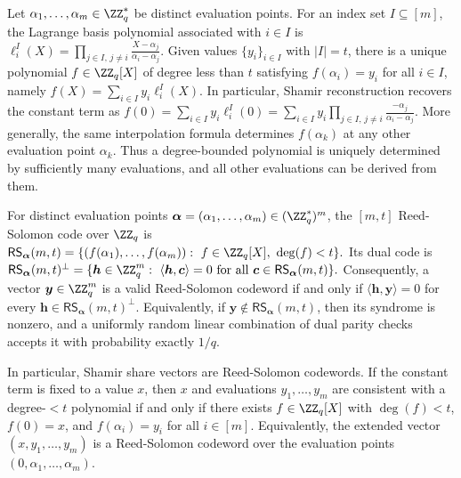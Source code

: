 \documentclass[runningheads]{llncs}
\begin{document}
\begin{definition}\label{def:lagrange_interpolation}
Let \(\alpha_1,\ldots,\alpha_m\in\ZZ_q^*\) be distinct evaluation points. For an index set \(I\subseteq[m]\), the Lagrange basis polynomial associated with \(i\in I\) is
$\ell_i^I(X)=\prod_{j\in I,\,j\neq i}\frac{X-\alpha_j}{\alpha_i-\alpha_j}.$
Given values \(\{y_i\}_{i\in I}\) with \(|I|=t\), there is a unique polynomial \(f\in\ZZ_q[X]\) of degree less than \(t\) satisfying \(f(\alpha_i)=y_i\) for all \(i\in I\), namely
$f(X)=\sum_{i\in I} y_i\ell_i^I(X).$
In particular, Shamir reconstruction recovers the constant term as
$f(0)=\sum_{i\in I} y_i\ell_i^I(0)
    =\sum_{i\in I} y_i\prod_{j\in I,\,j\neq i}\frac{-\alpha_j}{\alpha_i-\alpha_j}.$
More generally, the same interpolation formula determines \(f(\alpha_k)\) at any other evaluation point \(\alpha_k\). Thus a degree-bounded polynomial is uniquely determined by sufficiently many evaluations, and all other evaluations can be derived from them.
\end{definition}

\begin{definition}\label{def:rs_dual_code}
For distinct evaluation points \(\boldsymbol{\alpha}=(\alpha_1,\ldots,\alpha_m)\in(\ZZ_q^*)^m\), the \([m,t]\) Reed-Solomon code over \(\ZZ_q\) is
$\mathsf{RS}_{\boldsymbol{\alpha}}(m,t)=\{(f(\alpha_1),\ldots,f(\alpha_m)):\ f\in\ZZ_q[X],\ \deg(f)<t\}.$
Its dual code is
$\mathsf{RS}_{\boldsymbol{\alpha}}(m,t)^\perp=\{\boldsymbol{h}\in\ZZ_q^m:\ \langle \boldsymbol{h},\boldsymbol{c}\rangle=0
    \text{ for all } \boldsymbol{c}\in\mathsf{RS}_{\boldsymbol{\alpha}}(m,t)\}.$
Consequently, a vector \(\boldsymbol{y}\in\ZZ_q^m\) is a valid Reed-Solomon codeword if and only if
\(\langle \boldsymbol{h},\boldsymbol{y}\rangle=0\) for every
\(\boldsymbol{h}\in\mathsf{RS}_{\boldsymbol{\alpha}}(m,t)^\perp\).
Equivalently, if \(\boldsymbol{y}\notin\mathsf{RS}_{\boldsymbol{\alpha}}(m,t)\), then its syndrome is nonzero, and a uniformly random linear combination of dual parity checks accepts it with probability exactly \(1/q\).

In particular, Shamir share vectors are Reed-Solomon codewords. If the constant term is fixed to a value \(x\), then \(x\) and evaluations \(y_1,\ldots,y_m\) are consistent with a degree-\(<t\) polynomial if and only if there exists \(f\in\ZZ_q[X]\) with \(\deg(f)<t\), \(f(0)=x\), and \(f(\alpha_i)=y_i\) for all \(i\in[m]\). Equivalently, the extended vector \((x,y_1,\ldots,y_m)\) is a Reed-Solomon codeword over the evaluation points \((0,\alpha_1,\ldots,\alpha_m)\).
\end{definition}
\end{document}

